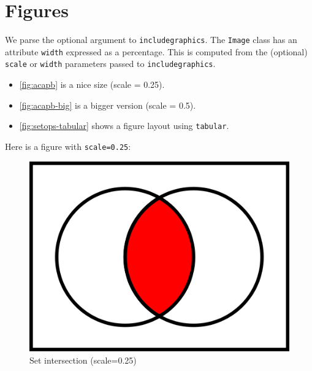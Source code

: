 
\section{Figures}

We parse the optional argument to \texttt{includegraphics}. The \texttt{Image} class has an attribute \texttt{width} expressed as a percentage. This is computed from the (optional) \texttt{scale} or \texttt{width} parameters passed to \texttt{includegraphics}.

\begin{itemize}
\item \autoref{fig:acapb} is a nice size (scale = 0.25).
\item \autoref{fig:acapb-big} is a bigger version (scale = 0.5).
\item \autoref{fig:setops-tabular} shows a figure layout using \texttt{tabular}. %
\end{itemize}

Here is a figure with {\tt scale=0.25}:
\begin{figure}[ht]
\centering
\includegraphics[scale=0.25]{AcapB}
\caption{Set intersection (scale=0.25)\label{fig:acapb}}
\end{figure}

